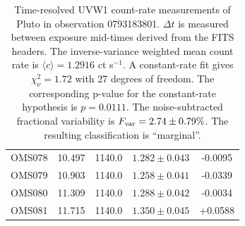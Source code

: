 \begin{table}[t]
\begin{tabular}{lcccc}
OMS078 & 10.497 & 1140.0 & $1.282 \pm 0.043$ & -0.0095 \\
OMS079 & 10.903 & 1140.0 & $1.258 \pm 0.041$ & -0.0339 \\
OMS080 & 11.309 & 1140.0 & $1.288 \pm 0.042$ & -0.0034 \\
OMS081 & 11.715 & 1140.0 & $1.350 \pm 0.045$ & +0.0588 \\
\bottomrule
\end{tabular}
\caption{Time-resolved UVW1 count-rate measurements of Pluto in observation 0793183801. $\Delta t$ is measured between exposure mid-times derived from the FITS headers. The inverse-variance weighted mean count rate is $\langle c\rangle=1.2916$ ct s$^{-1}$. A constant-rate fit gives $\chi^2_\nu=1.72$ with 27 degrees of freedom. The corresponding p-value for the constant-rate hypothesis is $p=0.0111$. The noise-subtracted fractional variability is $F_{\rm var}=2.74\pm0.79\%$. The resulting classification is ``marginal''.}
\label{tab:pluto-time-series}
\end{table}
